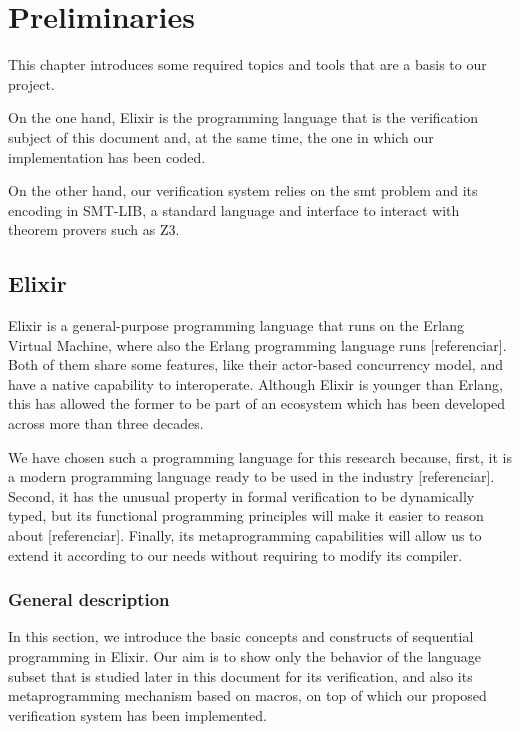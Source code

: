 \chapter{Preliminaries}
\label{cap:preliminaries}

This chapter introduces some required topics and tools that are a basis to
our project.

On the one hand, Elixir is the programming language that is the verification
subject of this document and, at the same time, the one in which our
implementation has been coded.

On the other hand, our verification system relies on the \gls{smt} problem and
its encoding in SMT-LIB, a standard language and interface to interact with
theorem provers such as Z3.

\section{Elixir}

Elixir is a general-purpose programming language that runs on the Erlang
Virtual Machine, where also the Erlang programming language runs [referenciar].
Both of them share some features, like their actor-based concurrency model,
and have a native capability to interoperate. Although Elixir is younger than
Erlang, this has allowed the former to be part of an ecosystem which has been
developed across more than three decades.

We have chosen such a programming language for this research because,
first, it is a modern programming language ready to be used in the
industry [referenciar]. Second, it has the unusual property in formal 
verification to be dynamically typed, but its functional programming principles
will make it easier to reason about [referenciar]. Finally, its metaprogramming
capabilities will allow us to extend it according to our needs without requiring
to modify its compiler.

\subsection{General description}

In this section, we introduce the basic concepts and constructs of sequential
programming in Elixir. Our aim is to show only the behavior of the language
subset that is studied later in this document for its verification, and also
its metaprogramming mechanism based on macros, on top of which our proposed
verification system has been implemented.

